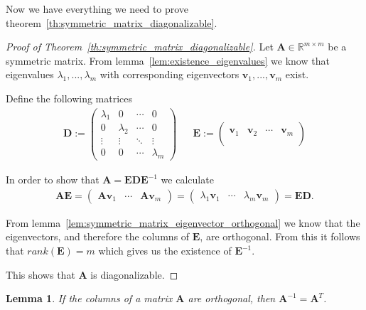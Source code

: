 \documentclass[a4paper]{IEEEtran}
\newtheorem{lemma}{Lemma}
\begin{document}
Now we have everything we need to prove theorem~\ref{th:symmetric_matrix_diagonalizable}. 

\begin{proof}[Proof of Theorem~\ref{th:symmetric_matrix_diagonalizable}]
	Let $\mathbf{A} \in \mathbb{R}^{m\times m}$ be a symmetric matrix. From lemma~\ref{lem:existence_eigenvalues} we know that eigenvalues $\lambda_1, ..., \lambda_m$ with corresponding eigenvectors $\mathbf{v}_1, ..., \mathbf{v}_m$ exist.
	
	Define the following matrices
	\begin{align*}
		\mathbf{D} := \left(\begin{matrix}
			\lambda_1 & 0 & \cdots & 0\\
			0 & \lambda_2 & \cdots & 0\\
			\vdots & \vdots & \ddots & \vdots\\
			0 & 0 & \cdots & \lambda_m
		\end{matrix}\right) &&
		\mathbf{E} := \left(\begin{matrix}
			 & & &\\
			\mathbf{v}_1 & \mathbf{v}_2 & \cdots & \mathbf{v}_m\\
			 & & &\\
		\end{matrix}\right)
	\end{align*}
	
	In order to show that $\mathbf{A} = \mathbf{EDE}^{-1}$ we calculate
	\begin{align*}
		\mathbf{AE} = \left(\begin{matrix}
			\mathbf{Av}_1 & \cdots & \mathbf{Av}_m
		\end{matrix}\right) = \left(\begin{matrix}
			\lambda_1\mathbf{v}_1 & \cdots & \lambda_m\mathbf{v}_m
		\end{matrix}\right) = \mathbf{ED}.
	\end{align*}
	
	From lemma~\ref{lem:symmetric_matrix_eigenvector_orthogonal} we know that the eigenvectors, and therefore the columns of $\mathbf{E}$, are orthogonal. From this it follows that $rank(\mathbf{E}) = m$ which gives us the existence of $\mathbf{E}^{-1}$.
	
	This shows that $\mathbf{A}$ is diagonalizable.
\end{proof}

\begin{lemma}
	If the columns of a matrix $\mathbf{A}$ are orthogonal, then $\mathbf{A}^{-1} = \mathbf{A}^T$.
\end{lemma}
\end{document}
